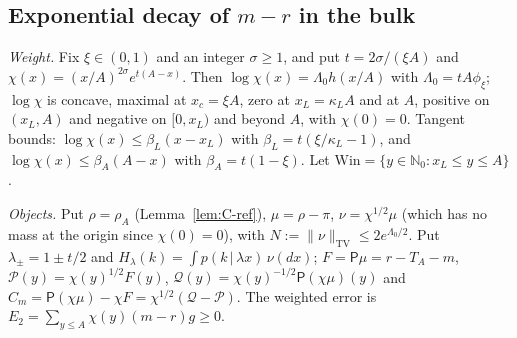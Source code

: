 \documentclass[10pt,letterpaper]{article}
\begin{document}
\subsection{Exponential decay of $m-r$ in the bulk}

\emph{Weight.} Fix $\xi\in(0,1)$ and an integer $\sigma\ge1$, and put $t=2\sigma/(\xi A)$ and $\chi(x)=(x/A)^{2\sigma}e^{t(A-x)}$. Then
$\log\chi(x)=\Lambda_0h(x/A)$ with $\Lambda_0=tA\phi_\xi$; $\log\chi$ is concave, maximal at $x_c=\xi A$, zero at $x_L=\kappa_LA$ and at
$A$, positive on $(x_L,A)$ and negative on $[0,x_L)$ and beyond $A$, with $\chi(0)=0$. Tangent bounds:
$\log\chi(x)\le\beta_L(x-x_L)$ with $\beta_L=t(\xi/\kappa_L-1)$, and $\log\chi(x)\le\beta_A(A-x)$ with $\beta_A=t(1-\xi)$.
Let $\mathrm{Win}=\{y\in\mathbb N_0:x_L\le y\le A\}$.

\emph{Objects.} Put $\rho=\rho_A$ (Lemma~\ref{lem:C-ref}), $\mu=\rho-\pi$, $\nu=\chi^{1/2}\mu$ (which has no mass at the origin since $\chi(0)=0$),
with $N:=\|\nu\|_{\mathrm{TV}}\le2e^{\Lambda_0/2}$. Put $\lambda_\pm=1\pm t/2$ and $H_\lambda(k)=\int p(k\,|\,\lambda x)\,\nu(dx)$;
$F=\mathsf P\mu=r-T_A-m$, $\mathcal P(y)=\chi(y)^{1/2}F(y)$, $\mathcal Q(y)=\chi(y)^{-1/2}\mathsf P(\chi\mu)(y)$ and
$C_m=\mathsf P(\chi\mu)-\chi F=\chi^{1/2}(\mathcal Q-\mathcal P)$. The weighted error is
$E_2=\sum_{y\le A}\chi(y)(m-r)g\ge0$.
\end{document}

